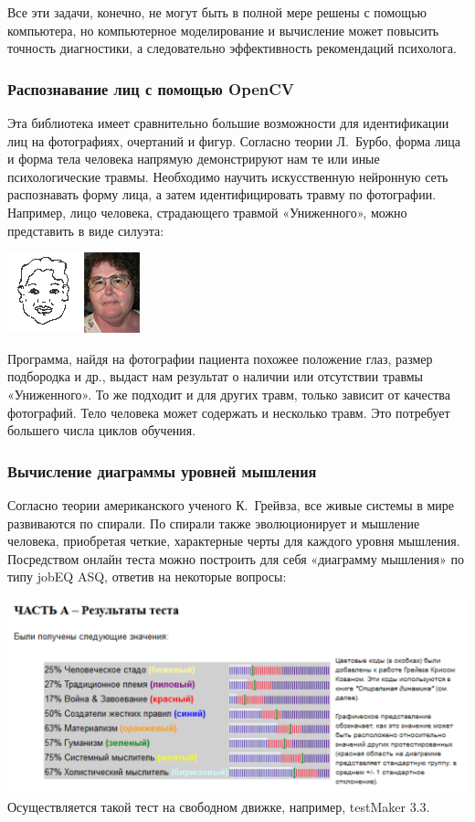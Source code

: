 \documentclass[10pt, a5paper]{article}
\begin{document}
Все эти задачи, конечно, не могут быть в полной мере решены с помощью компьютера, но компьютерное моделирование и вычисление может повысить точность диагностики, а следовательно эффективность рекомендаций психолога.

\subsubsection*{Распознавание лиц с помощью OpenCV}

Эта библиотека имеет сравнительно большие возможности для идентификации лиц на фотографиях, очертаний и фигур. Согласно теории Л.~Бурбо, форма лица и форма тела человека напрямую демонстрируют нам те или иные психологические травмы. Необходимо научить искусственную нейронную сеть распознавать форму лица, а затем идентифицировать травму по фотографии. Например, лицо человека, страдающего травмой «Униженного», можно представить в виде силуэта:
\begin{center}
  \includegraphics[scale=0.7]{111_2014_w_Kononova_face.png}
\end{center}

Программа, найдя на фотографии пациента похожее положение глаз, размер подбородка и др., выдаст нам результат о наличии или отсутствии травмы «Униженного». То же подходит и для других травм, только зависит от качества фотографий. Тело человека может содержать и несколько травм. Это потребует большего числа циклов обучения.

\subsubsection*{Вычисление диаграммы уровней мышления}

Согласно теории американского ученого К.~Грейвза, все живые системы в мире развиваются по спирали. По спирали также эволюционирует и мышление человека, приобретая четкие, характерные черты для каждого уровня мышления. Посредством онлайн теста можно построить для себя «диаграмму мышления» по типу jobEQ ASQ, ответив на некоторые вопросы:
\begin{center}
  \includegraphics[width=\textwidth]{111_2014_w_Kononova_results.png}
	Осуществляется такой тест на свободном движке, например, testMaker 3.3.
\end{center}
\end{document}
